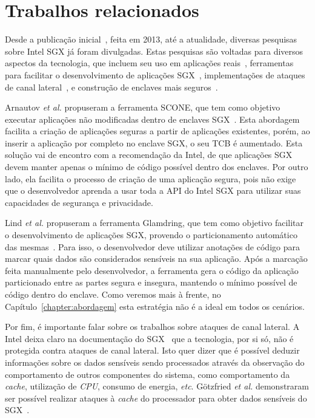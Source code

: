 \section{Trabalhos relacionados}
\label{sec:estadoarte_trabalhos_relacionados}

Desde a publicação inicial~\cite{mckeen2013innovative}, feita em 2013, até a
atualidade, diversas pesquisas sobre Intel SGX já foram divulgadas. Estas
pesquisas são voltadas para diversos aspectos da tecnologia, que incluem seu uso
em aplicações reais~\cite{krawiecka2016protecting,fetzer2016building,sac2017},
ferramentas para facilitar o desenvolvimento de aplicações SGX~\cite
{scone,tsai2017graphene,baumann2015shielding,DynSGXCloudCom2017}, implementações
de ataques de canal lateral~\cite
{hahnel2017high,cachezoom2017,schwarz2017malware}, e construção de enclaves mais
seguros~\cite{gruss2017strong,lind2017glamdring,kuvaiskii2017sgxbounds}.

Arnautov \textit{et al.} propuseram a ferramenta SCONE, que tem como objetivo
executar aplicações não modificadas dentro de enclaves SGX~\cite{scone}. Esta abordagem
facilita a criação de aplicações seguras a partir de aplicações existentes,
porém, ao inserir a aplicação por completo no enclave SGX, o seu TCB é
aumentado. Esta solução vai de encontro com a recomendação da Intel, de que
aplicações SGX devem manter apenas o mínimo de código possível dentro dos
enclaves. Por outro lado, ela facilita o processo de criação de uma aplicação
segura, pois não exige que o desenvolvedor aprenda a usar toda a API do Intel
SGX para utilizar suas capacidades de segurança e privacidade.

Lind \textit{et al.} propuseram a ferramenta Glamdring, que tem como objetivo
facilitar o desenvolvimento de aplicações SGX, provendo o particionamento
automático das mesmas~\cite{lind2017glamdring}. Para isso, o desenvolvedor deve
utilizar anotações de código para marcar quais dados são considerados sensíveis
na sua aplicação. Após a marcação feita manualmente pelo desenvolvedor, a
ferramenta gera o código da aplicação particionado entre as partes segura e
insegura, mantendo o mínimo possível de código dentro do enclave. Como veremos
mais à frente, no Capítulo~\ref{chapter:abordagem} esta estratégia não é a ideal
em todos os cenários.

Por fim, é importante falar sobre os trabalhos sobre ataques de canal lateral. A
Intel deixa claro na documentação do SGX~\cite{sgxdeveloperreference} que a
tecnologia, por si só, não é protegida contra ataques de canal lateral. Isto
quer dizer que é possível deduzir informações sobre os dados sensíveis sendo
processados através da observação do comportamento de outros componentes do
sistema, como comportamento da \textit{cache}, utilização de \textit{CPU},
consumo de energia, \textit{etc}. Götzfried \textit{et al.} demonstraram ser
possível realizar ataques à \textit{cache} do processador para obter dados
sensíveis do SGX~\cite{gotzfried2017cache}.

